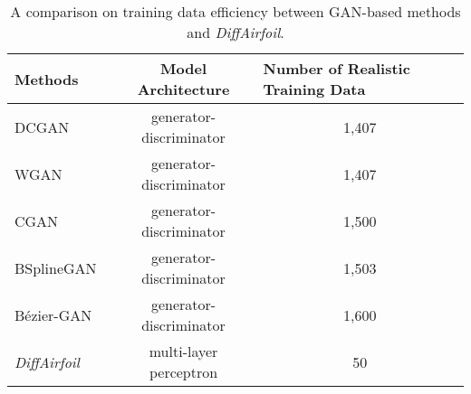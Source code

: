 \begin{table}[htbp]
  \centering
  \caption{A comparison on training data efficiency between GAN-based methods and \textit{DiffAirfoil}.}
    \begin{tabular}{l|cc}
    \hline
    \textbf{Methods} & \textbf{Model Architecture} & \multicolumn{1}{l}{\textbf{Number of Realistic Training Data}}\\
    \hline
    DCGAN~\cite{Li20i}  & generator-discriminator & 1,407\\
    WGAN~\cite{Li21}  & generator-discriminator & 1,407\\
    CGAN~\cite{Achour20}   & generator-discriminator & 1,500 \\
    BSplineGAN~\cite{Du20}  & generator-discriminator & 1,503\\
    Bézier-GAN~\cite{Chen20d} & generator-discriminator & 1,600 \\
    \textit{DiffAirfoil} & multi-layer perceptron & 50  \\
    \hline
    \end{tabular}%
  \label{ch6:tab:main_paper_tab_intro}%
\end{table}%